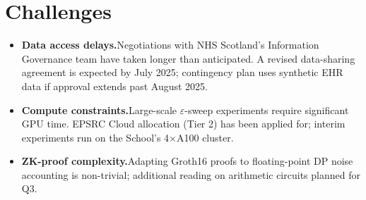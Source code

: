 \section{Challenges}

\begin{itemize}[leftmargin=*, itemsep=1pt, topsep=2pt]
  \item \textbf{Data access delays.}\enspace Negotiations with NHS Scotland's Information
        Governance team have taken longer than anticipated. A revised data-sharing agreement
        is expected by July 2025; contingency plan uses synthetic EHR data if approval extends
        past August 2025.

  \item \textbf{Compute constraints.}\enspace Large-scale $\varepsilon$-sweep experiments
        require significant GPU time. EPSRC Cloud allocation (Tier 2) has been applied for;
        interim experiments run on the School's 4×A100 cluster.

  \item \textbf{ZK-proof complexity.}\enspace Adapting Groth16 proofs to floating-point
        DP noise accounting is non-trivial; additional reading on arithmetic circuits
        planned for Q3.
\end{itemize}

